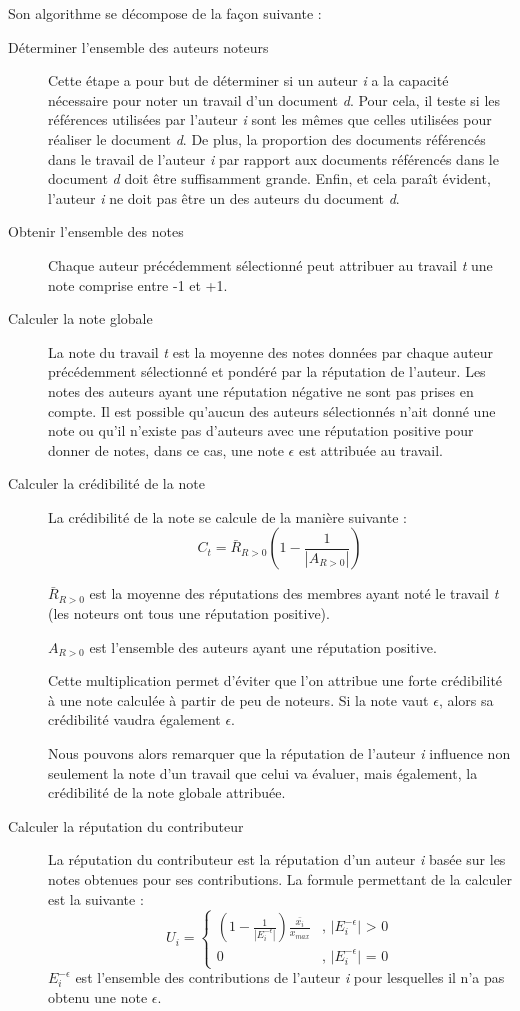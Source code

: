 \documentclass[a4paper, 11pt]{article} %
\begin{document}
Son algorithme se décompose de la façon suivante :
\begin{description}
	\item[Déterminer l'ensemble des auteurs noteurs] Cette étape a pour but de déterminer si un auteur \textit{i} a la capacité nécessaire pour noter un travail d'un document \textit{d}. Pour cela, il teste si les références utilisées par l'auteur \textit{i} sont les mêmes que celles utilisées pour réaliser le document \textit{d}. De plus, la proportion des documents référencés dans le travail de l'auteur \textit{i} par rapport aux documents référencés dans le document \textit{d} doit être suffisamment grande. Enfin, et cela paraît évident, l'auteur \textit{i} ne doit pas être un des auteurs du document \textit{d}.
	\item[Obtenir l'ensemble des notes] Chaque auteur précédemment sélectionné peut attribuer au travail \textit{t} une note comprise entre -1 et +1.
	\item[Calculer la note globale] La note du travail \textit{t} est la moyenne des notes données par chaque auteur précédemment sélectionné et pondéré par la réputation de l'auteur. Les notes des auteurs ayant une réputation négative ne sont pas prises en compte. Il est possible qu'aucun des auteurs sélectionnés n'ait donné une note ou qu'il n'existe pas d'auteurs avec une réputation positive pour donner de notes, dans ce cas, une note $\epsilon$ est attribuée au travail.
	\item[Calculer la crédibilité de la note] La crédibilité de la note se calcule de la manière suivante :
$$C_{t} = \bar{R}_{R>0} (1 - \frac{1}{|A_{R>0}|})$$

$\bar{R}_{R>0}$ est la moyenne des réputations des membres ayant noté le travail \textit{t} (les noteurs ont tous une réputation positive).

$A_{R>0}$ est l'ensemble des auteurs ayant une réputation positive.

Cette multiplication permet d'éviter que l'on attribue une forte crédibilité à une note calculée à partir de peu de noteurs. Si la note vaut $\epsilon$, alors sa crédibilité vaudra également $\epsilon$.

Nous pouvons alors remarquer que la réputation de l'auteur \textit{i} influence non seulement la note d'un travail que celui va évaluer, mais également, la crédibilité de la note globale attribuée.

	\item[Calculer la réputation du contributeur] La réputation du contributeur est la réputation d'un auteur \textit{i} basée sur les notes obtenues pour ses contributions. La formule permettant de la calculer est la suivante : 
$$
U_{i} = \left\{
	\begin{array}{ll}
		(1 - \frac{1}{|E_{i}^{-\epsilon}|}) \frac{\bar{x_{i}}}{x_{max}} & \mbox{, |$E_{i}^{-\epsilon}$| > 0}\\
		0 & \mbox{, |$E_{i}^{-\epsilon}$| = 0}
	\end{array}
\right.
$$
$E_{i}^{-\epsilon}$ est l'ensemble des contributions de l'auteur \textit{i} pour lesquelles il n'a pas obtenu une note ${\epsilon}$.


\end{description}
\end{document}
